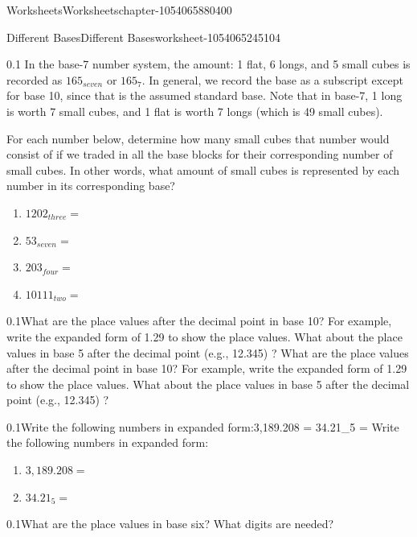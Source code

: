 \documentclass[twoside,11pt,]{book}
\begin{document}
\begin{chapterptx}{Worksheets}{}{Worksheets}{}{}{chapter-1054065880400}
\begin{worksheet-section-numberless}{Different Bases}{}{Different Bases}{}{}{worksheet-1054065245104}
\begin{divisionexercise}{1}{}{0.1}
\hypertarget{p-1054066154832}{}%
In the base-7 number system, the amount: 1 flat, 6 longs, and 5 small cubes is recorded as \(165_{seven}\) or \(165_7\). In general, we record the base as a subscript except for base 10, since that is the assumed standard base.  Note that in base-7, 1 long is worth 7 small cubes, and 1 flat is worth 7 longs (which is 49 small cubes).%
\par
\hypertarget{p-1054066161504}{}%
For each number below, determine how many small cubes that number would consist of if we traded in all the base blocks for their corresponding number of small cubes.  In other words, what amount of small cubes is represented by each number in its corresponding base?%
\leavevmode%
\begin{enumerate}[label=(\alph*)]
\item\hypertarget{li-1054066077232}{}\(1202_{three}   = \)%
\item\hypertarget{li-1054063339712}{}\(53_{seven}       = \)%
\item\hypertarget{li-1054066307840}{}\(203_{four}       = \)%
\item\hypertarget{li-1054067111456}{}\(10111_{two}       = \)%
\end{enumerate}
\end{divisionexercise}%
\begin{divisionexercise}{2}{}{0.1}{What are the place values after the decimal point in base 10? For example, write the expanded form of 1.29 to show the place values. What about the place values in base 5 after the decimal point (e.g., 12.345) ?}%
\hypertarget{p-1054064013280}{}%
What are the place values after the decimal point in base 10? For example, write the expanded form of 1.29 to show the place values. What about the place values in base 5 after the decimal point (e.g., 12.345) ?%
\end{divisionexercise}%
\begin{divisionexercise}{3}{}{0.1}{Write the following numbers in expanded form:3,189.208 = 34.21_5      =  }%
\hypertarget{p-1054066961744}{}%
Write the following numbers in expanded form:%
\leavevmode%
\begin{enumerate}[label=(\alph*)]
\item\hypertarget{li-1054066958432}{}\(3,189.208 = \)%
\item\hypertarget{li-1054064402048}{}\(34.21_5      = \)%
\end{enumerate}
\end{divisionexercise}%
\begin{divisionexercise}{4}{}{0.1}{What are the place values in base six?  What digits are needed?}%

\end{divisionexercise}
\end{worksheet-section-numberless}
\end{chapterptx}
\end{document}
